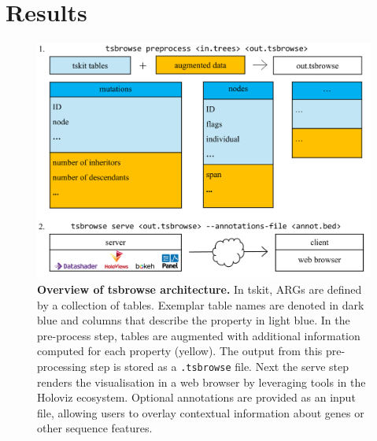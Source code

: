 \documentclass[unnumsec,webpdf,contemporary,large,namedate]{oup-authoring-template}%
\begin{document}



\section{Results}

\begin{figure} \centering
    \includegraphics[width=0.95\linewidth]{figures/MainFig1.png}
    \caption{\textbf{Overview of tsbrowse architecture. } In tskit, ARGs are
        defined by a collection of tables. Exemplar
        table names are denoted in dark blue and columns that describe the property in
        light blue. In the pre-process step, tables are augmented with additional
        information computed for each property (yellow). The output from this
        pre-processing step is stored as a \texttt{.tsbrowse} file. Next the serve step
        renders the visualisation in a web browser by leveraging tools in the Holoviz
        ecosystem. Optional annotations are provided as an input file, allowing users
        to overlay contextual information about genes or other sequence features. }
    \label{fig:Figure_1} \end{figure}
\end{document}

